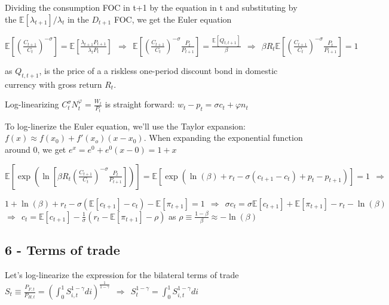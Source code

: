 \documentclass[
]{article}
\begin{document}
Dividing the consumption FOC in t+1 by the equation in t and
substituting by the \(\mathbb{E}[\lambda_{t+1}]/\lambda_t\) in the
\(D_{t+1}\) FOC, we get the Euler equation

\(\displaystyle \mathbb{E} \left[ \left( \frac{C_{t+1}}{C_t} \right)^{-\sigma} \right] = \mathbb{E} \left[ \frac{\lambda_{t+1} P_{t+1}}{\lambda_t P_t} \right] \ \ \Rightarrow \ \  \mathbb{E} \left[ \left( \frac{C_{t+1}}{C_t} \right)^{-\sigma} \frac{P_t}{P_{t+1}}\right]= \frac{\mathbb{E}[Q_{t,t+1}]}{\beta} \ \ \Rightarrow \ \ \beta R_t \mathbb{E} \left[ \left( \frac{C_{t+1}}{C_t} \right)^{-\sigma} \frac{P_t}{P_{t+1}}\right]= 1\)

as \(Q_{t,t+1}\), is the price of a a riskless one-period discount bond
in domestic currency with gross return \(R_t\).

Log-linearizing
\(\displaystyle C_t^{\sigma}N_t^{\varphi} = \frac{W_t}{P_t}\) is
straight forward: \(w_t - p_t = \sigma c_t + \varphi n_t\)

To log-linerize the Euler equation, we'll use the Taylor expansion:
\(f(x) \approx f(x_0) + f'(x_o)(x-x_0)\). When expanding the exponential
function around 0, we get \(e^x=e^0+e^0(x-0)=1+x\)

\(\mathbb{E} \left[ \exp \left( \ln \left[ \beta R_t \left( \frac{C_{t+1}}{C_t} \right)^{-\sigma} \frac{P_t}{P_{t+1}} \right] \right) \right] = \mathbb{E} \left[ \exp \left( \ln(\beta) + r_t -\sigma(c_{t+1}-c_t) + p_t - p_{t+1} \right) \right] = 1 \ \ \Rightarrow\)

\(\displaystyle 1 + \ln(\beta) + r_t -\sigma(\mathbb{E} \left[c_{t+1} \right]-c_t) - \mathbb{E} \left[ \pi_{t+1} \right] = 1 \ \ \Rightarrow \ \ \sigma c_t = \sigma \mathbb{E} \left[c_{t+1} \right] + \mathbb{E} \left[ \pi_{t+1} \right] - r_t - \ln(\beta)\)
\(\displaystyle \Rightarrow \ \ c_t = \mathbb{E} \left[c_{t+1} \right] -\frac{1}{\sigma} \left( r_t - \mathbb{E} \left[ \pi_{t+1} \right] -\rho\right)\)
as \(\rho \equiv \frac{1-\beta}{\beta} \approx -\ln(\beta)\)

\hypertarget{terms-of-trade}{%
\subsection{6 - Terms of trade}\label{terms-of-trade}}

Let's log-linearize the expression for the bilateral terms of trade
\(\displaystyle S_t \equiv \frac{P_{F,t}}{P_{H,t}}= \left( \int_0^1 S_{i,t}^{1-\gamma}di \right)^{\frac{1}{1-\gamma}} \ \ \Rightarrow \ \ S_t^{1-\gamma} = \int_0^1 S_{i,t}^{1-\gamma}di\)
\end{document}

